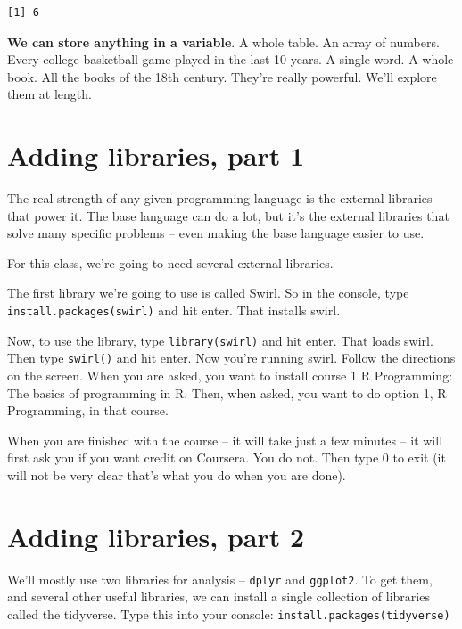 \documentclass[
  letterpaper,
  DIV=11,
  numbers=noendperiod]{scrreprt}
\begin{document}
\begin{verbatim}
[1] 6
\end{verbatim}

\textbf{We can store anything in a variable}. A whole table. An array of
numbers. Every college basketball game played in the last 10 years. A
single word. A whole book. All the books of the 18th century. They're
really powerful. We'll explore them at length.

\hypertarget{adding-libraries-part-1}{%
\section{Adding libraries, part 1}\label{adding-libraries-part-1}}

The real strength of any given programming language is the external
libraries that power it. The base language can do a lot, but it's the
external libraries that solve many specific problems -- even making the
base language easier to use.

For this class, we're going to need several external libraries.

The first library we're going to use is called Swirl. So in the console,
type
\texttt{install.packages(\textquotesingle{}swirl\textquotesingle{})} and
hit enter. That installs swirl.

Now, to use the library, type \texttt{library(swirl)} and hit enter.
That loads swirl. Then type \texttt{swirl()} and hit enter. Now you're
running swirl. Follow the directions on the screen. When you are asked,
you want to install course 1 R Programming: The basics of programming in
R. Then, when asked, you want to do option 1, R Programming, in that
course.

When you are finished with the course -- it will take just a few minutes
-- it will first ask you if you want credit on Coursera. You do not.
Then type 0 to exit (it will not be very clear that's what you do when
you are done).

\hypertarget{adding-libraries-part-2}{%
\section{Adding libraries, part 2}\label{adding-libraries-part-2}}

We'll mostly use two libraries for analysis -- \texttt{dplyr} and
\texttt{ggplot2}. To get them, and several other useful libraries, we
can install a single collection of libraries called the tidyverse. Type
this into your console:
\texttt{install.packages(\textquotesingle{}tidyverse\textquotesingle{})}
\end{document}
